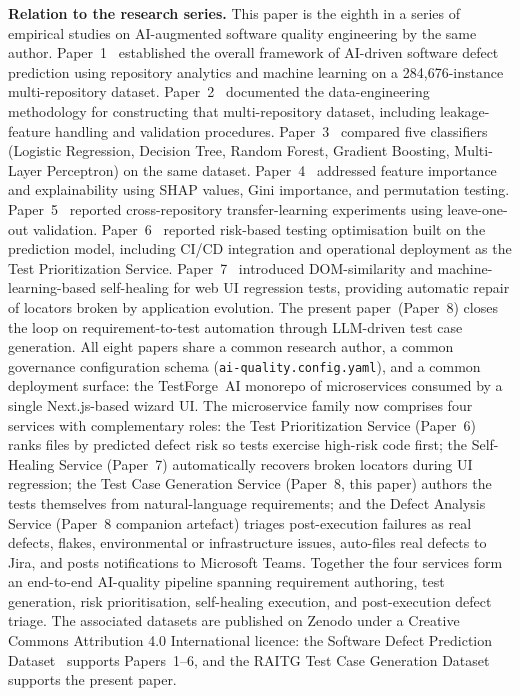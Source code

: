 \documentclass[conference]{IEEEtran}
\begin{document}
\textbf{Relation to the research series.} This paper is the eighth in a series of empirical studies on AI-augmented software quality engineering by the same author.
Paper~1~\cite{javvadi2024paper1} established the overall framework of AI-driven software defect prediction using repository analytics and machine learning on a 284{,}676-instance multi-repository dataset.
Paper~2~\cite{javvadi2024paper2} documented the data-engineering methodology for constructing that multi-repository dataset, including leakage-feature handling and validation procedures.
Paper~3~\cite{javvadi2024paper3} compared five classifiers (Logistic Regression, Decision Tree, Random Forest, Gradient Boosting, Multi-Layer Perceptron) on the same dataset.
Paper~4~\cite{javvadi2024paper4} addressed feature importance and explainability using SHAP values, Gini importance, and permutation testing.
Paper~5~\cite{javvadi2024paper5} reported cross-repository transfer-learning experiments using leave-one-out validation.
Paper~6~\cite{javvadi2024paper6} reported risk-based testing optimisation built on the prediction model, including CI/CD integration and operational deployment as the Test Prioritization Service.
Paper~7~\cite{javvadi2024paper7} introduced DOM-similarity and machine-learning-based self-healing for web UI regression tests, providing automatic repair of locators broken by application evolution.
The present paper~(Paper~8) closes the loop on requirement-to-test automation through LLM-driven test case generation. All eight papers share a common research author, a common governance configuration schema (\texttt{ai-quality.config.yaml}), and a common deployment surface: the TestForge~AI monorepo of microservices consumed by a single Next.js-based wizard UI. The microservice family now comprises four services with complementary roles: the Test Prioritization Service (Paper~6) ranks files by predicted defect risk so tests exercise high-risk code first; the Self-Healing Service (Paper~7) automatically recovers broken locators during UI regression; the Test Case Generation Service (Paper~8, this paper) authors the tests themselves from natural-language requirements; and the Defect Analysis Service (Paper~8 companion artefact) triages post-execution failures as real defects, flakes, environmental or infrastructure issues, auto-files real defects to Jira, and posts notifications to Microsoft Teams. Together the four services form an end-to-end AI-quality pipeline spanning requirement authoring, test generation, risk prioritisation, self-healing execution, and post-execution defect triage. The associated datasets are published on Zenodo under a Creative Commons Attribution 4.0 International licence: the Software Defect Prediction Dataset~\cite{javvadi2025defect_dataset} supports Papers~1--6, and the RAITG Test Case Generation Dataset~\cite{javvadi2026raitg_dataset} supports the present paper.
\end{document}
